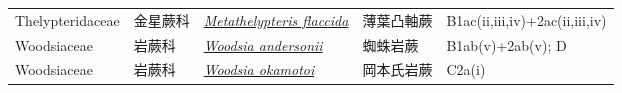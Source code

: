 {\begin{longtable}{L{2.5cm}L{2cm}L{5cm}L{2.5cm}L{3cm}}
    Thelypteridaceae & 金星蕨科 & \href{http://www.theplantlist.org/tpl1.1/search?q=Metathelypteris+flaccida}{\textit{Metathelypteris flaccida} } & 薄葉凸軸蕨 & B1ac(ii,iii,iv)+2ac(ii,iii,iv)    \\
    Woodsiaceae & 岩蕨科 & \href{http://www.theplantlist.org/tpl1.1/search?q=Woodsia+andersonii}{\textit{Woodsia andersonii} } & 蜘蛛岩蕨 & B1ab(v)+2ab(v); D    \\
    Woodsiaceae & 岩蕨科 & \href{http://www.theplantlist.org/tpl1.1/search?q=Woodsia+okamotoi}{\textit{Woodsia okamotoi} } & 岡本氏岩蕨 & C2a(i)    \\
    \bottomrule
        \end{longtable}
        }
    
